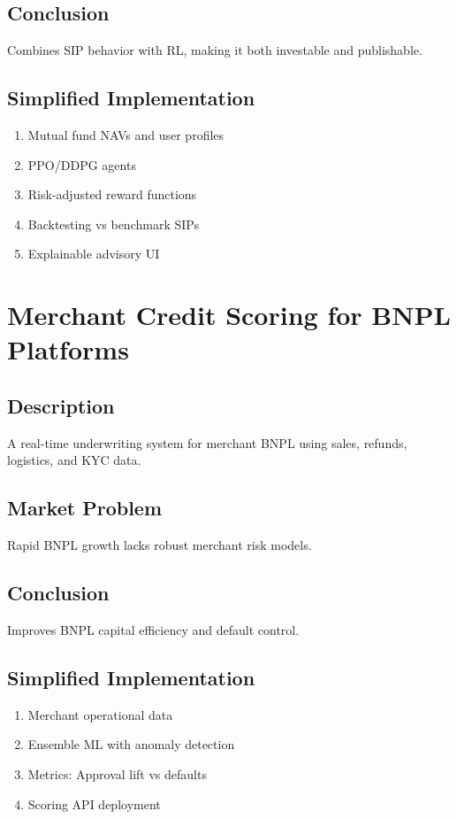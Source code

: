 \documentclass[11pt,a4paper]{article}
\begin{document}
\subsection*{Conclusion}
Combines SIP behavior with RL, making it both investable and publishable.

\subsection*{Simplified Implementation}
\begin{enumerate}[noitemsep]
    \item Mutual fund NAVs and user profiles
    \item PPO/DDPG agents
    \item Risk-adjusted reward functions
    \item Backtesting vs benchmark SIPs
    \item Explainable advisory UI
\end{enumerate}

\section{Merchant Credit Scoring for BNPL Platforms}

\subsection*{Description}
A real-time underwriting system for merchant BNPL using sales, refunds, logistics, and KYC data.

\subsection*{Market Problem}
Rapid BNPL growth lacks robust merchant risk models.

\subsection*{Conclusion}
Improves BNPL capital efficiency and default control.

\subsection*{Simplified Implementation}
\begin{enumerate}[noitemsep]
    \item Merchant operational data
    \item Ensemble ML with anomaly detection
    \item Metrics: Approval lift vs defaults
    \item Scoring API deployment
\end{enumerate}
\end{document}
